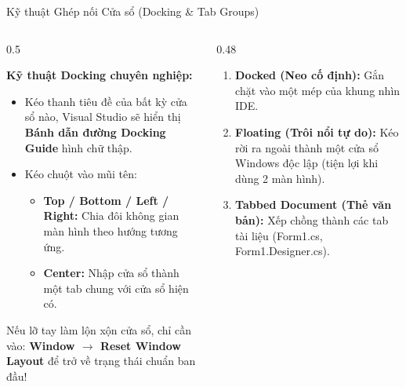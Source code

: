 \documentclass[aspectratio=169, 10pt]{beamer}
\begin{document}
\begin{frame}{Kỹ thuật Ghép nối Cửa sổ (Docking \& Tab Groups)}
  \begin{columns}[T]
    \begin{column}{0.5\textwidth}
      \begin{block}{\textbf{Kỹ thuật Docking chuyên nghiệp:}}
        \begin{itemize}\small
          \item Kéo thanh tiêu đề của bất kỳ cửa sổ nào, Visual Studio sẽ hiển thị \textbf{Bánh dẫn đường Docking Guide} hình chữ thập.
          \item Kéo chuột vào mũi tên:
            \begin{itemize}\footnotesize
              \item \textbf{Top / Bottom / Left / Right:} Chia đôi không gian màn hình theo hướng tương ứng.
              \item \textbf{Center:} Nhập cửa sổ thành một tab chung với cửa sổ hiện có.
            \end{itemize}
        \end{itemize}
      \end{block}
      \begin{tcolorbox}[colback=UniLightBlue!30,colframe=UniBlue,title=\textbf{Khôi phục bố cục mặc định:},fonttitle=\small\bfseries]
        \footnotesize Nếu lỡ tay làm lộn xộn cửa sổ, chỉ cần vào: \textbf{Window $\to$ Reset Window Layout} để trở về trạng thái chuẩn ban đầu!
      \end{tcolorbox}
    \end{column}

    \begin{column}{0.48\textwidth}
      \begin{tcolorbox}[colback=CSharpPurple!10,colframe=CSharpPurple,title=\textbf{3 Trạng thái Hiển thị Cửa sổ:},fonttitle=\small\bfseries]
        \begin{enumerate}\small
          \item \textbf{Docked (Neo cố định):} Gắn chặt vào một mép của khung nhìn IDE.
          \item \textbf{Floating (Trôi nổi tự do):} Kéo rời ra ngoài thành một cửa sổ Windows độc lập (tiện lợi khi dùng 2 màn hình).
          \item \textbf{Tabbed Document (Thẻ văn bản):} Xếp chồng thành các tab tài liệu (Form1.cs, Form1.Designer.cs).
        \end{enumerate}
      \end{tcolorbox}
    \end{column}
  \end{columns}
\end{frame}
\end{document}
